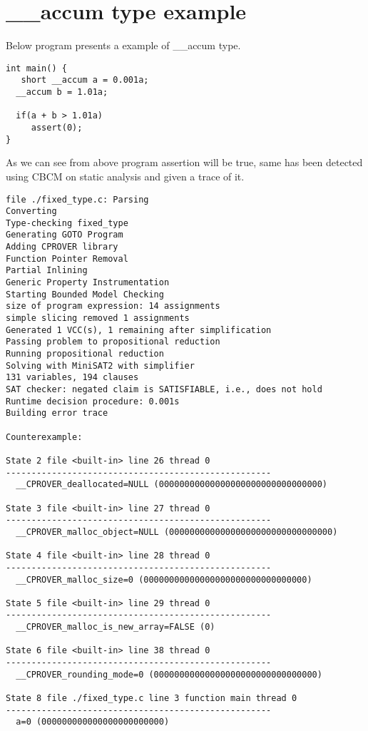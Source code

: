 \section{\_\_accum type example}

Below program presents a example of \_\_accum type.

\begin{lstlisting}
int main() {
   short __accum a = 0.001a;
  __accum b = 1.01a;

  if(a + b > 1.01a)
     assert(0);
}
\end{lstlisting}

As we can see from above program assertion will be true, same has been detected using CBCM on static analysis and given a trace of it.

\begin{lstlisting}
file ./fixed_type.c: Parsing
Converting
Type-checking fixed_type
Generating GOTO Program
Adding CPROVER library
Function Pointer Removal
Partial Inlining
Generic Property Instrumentation
Starting Bounded Model Checking
size of program expression: 14 assignments
simple slicing removed 1 assignments
Generated 1 VCC(s), 1 remaining after simplification
Passing problem to propositional reduction
Running propositional reduction
Solving with MiniSAT2 with simplifier
131 variables, 194 clauses
SAT checker: negated claim is SATISFIABLE, i.e., does not hold
Runtime decision procedure: 0.001s
Building error trace

Counterexample:

State 2 file <built-in> line 26 thread 0
----------------------------------------------------
  __CPROVER_deallocated=NULL (00000000000000000000000000000000)

State 3 file <built-in> line 27 thread 0
----------------------------------------------------
  __CPROVER_malloc_object=NULL (00000000000000000000000000000000)

State 4 file <built-in> line 28 thread 0
----------------------------------------------------
  __CPROVER_malloc_size=0 (00000000000000000000000000000000)

State 5 file <built-in> line 29 thread 0
----------------------------------------------------
  __CPROVER_malloc_is_new_array=FALSE (0)

State 6 file <built-in> line 38 thread 0
----------------------------------------------------
  __CPROVER_rounding_mode=0 (00000000000000000000000000000000)

State 8 file ./fixed_type.c line 3 function main thread 0
----------------------------------------------------
  a=0 (000000000000000000000000)


\end{lstlisting}
